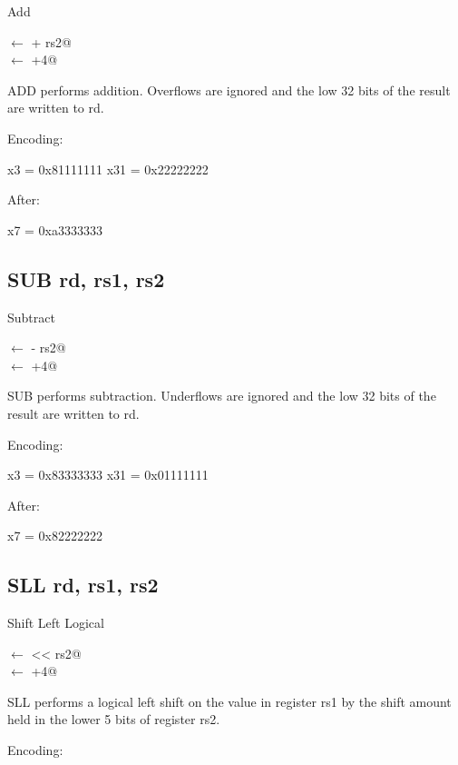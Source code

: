 Add 

\verb@rd@ $\leftarrow$  + rs2@\\
\verb@pc@ $\leftarrow$ \verb@pc+4@

ADD performs addition. Overflows are ignored and the low 32 bits of 
the result are written to rd.~\cite[p.~15]{rvismv1v22:2017}

Encoding:


x3  = 0x81111111
x31 = 0x22222222

After:

x7 = 0xa3333333

\subsection{SUB rd, rs1, rs2}

Subtract

\verb@rd@ $\leftarrow$  - rs2@\\
\verb@pc@ $\leftarrow$ \verb@pc+4@

SUB performs subtraction. Underflows are ignored and the low 32 bits of 
the result are written to rd.~\cite[p.~15]{rvismv1v22:2017}

Encoding:


x3  = 0x83333333
x31 = 0x01111111

After:

x7 = 0x82222222


\subsection{SLL rd, rs1, rs2}

Shift Left Logical

\verb@rd@ $\leftarrow$  << rs2@\\
\verb@pc@ $\leftarrow$ \verb@pc+4@

SLL performs a logical left shift on the value in register rs1 by 
the shift amount held in the lower 5 bits of register rs2.~\cite[p.~15]{rvismv1v22:2017}

Encoding:


